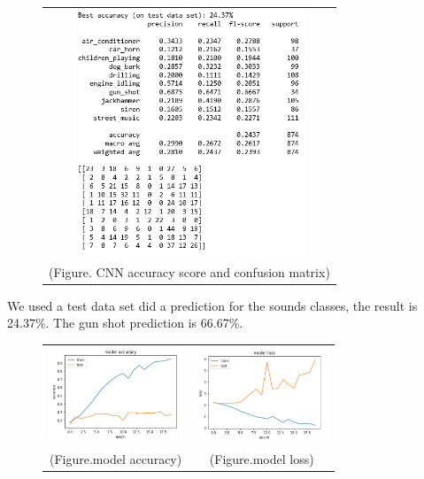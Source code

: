 \documentclass{article}
\begin{document}
\begin{figure}[!htb]
    \begin{tabular}{c}
        \includegraphics[width=7cm]{pic/CNN_Pm.png}\\
    (Figure. CNN accuracy score and confusion matrix)
    \end{tabular}
\end{figure}
We used a test data set did a prediction for the sounds classes, the result is 24.37\%. The gun shot prediction is 66.67\%.
\begin{figure}[!htb]
    \begin{tabular}{cc}
        \includegraphics[width=4cm]{pic/CNN_ACC.png}
        &\includegraphics[width=4cm]{pic/CNN_LOSS.PNG}\\
    (Figure.model accuracy)&(Figure.model loss)
    \end{tabular}
\end{figure}
\end{document}
